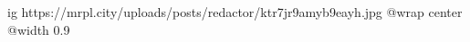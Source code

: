  
 
 
 
 

\ifcmt
  ig https://mrpl.city/uploads/posts/redactor/ktr7jr9amyb9eayh.jpg
  @wrap center
  @width 0.9
\fi
